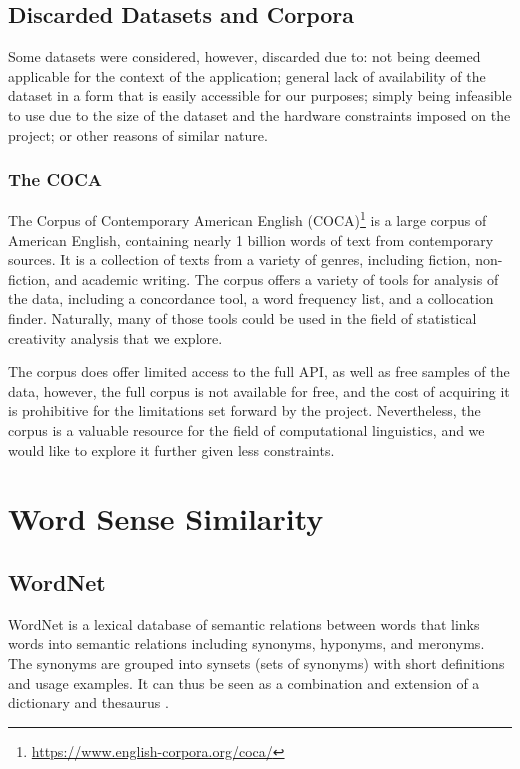 
\subsection{Discarded Datasets and Corpora}
Some datasets were considered, however, discarded due to: not being deemed applicable for the context of the application; general lack of availability of the dataset in a form that is easily accessible for our purposes; simply being infeasible to use due to the size of the dataset and the hardware constraints imposed on the project; or other reasons of similar nature.

\subsubsection*{The COCA}
The Corpus of Contemporary American English (COCA)\footnote[2]{\url{https://www.english-corpora.org/coca/}} is a large corpus of American English, containing nearly 1 billion words of text from contemporary sources. It is a collection of texts from a variety of genres, including fiction, non-fiction, and academic writing. The corpus offers a variety of tools for analysis of the data, including a concordance tool, a word frequency list, and a collocation finder. Naturally, many of those tools could be used in the field of statistical creativity analysis that we explore.

The corpus does offer limited access to the full API, as well as free samples of the data, however, the full corpus is not available for free, and the cost of acquiring it is prohibitive for the limitations set forward by the project. Nevertheless, the corpus is a valuable resource for the field of computational linguistics, and we would like to explore it further given less constraints.

\section{Word Sense Similarity}

\subsection{WordNet}\label{sec:wordnet}
WordNet\citep{wordnet1998fellbaum} is a lexical database of semantic relations between words that links words into semantic relations including synonyms, hyponyms, and meronyms. The synonyms are grouped into synsets (sets of synonyms) with short definitions and usage examples. It can thus be seen as a combination and extension of a dictionary and thesaurus \citep{enwiki:1143619785}. 

